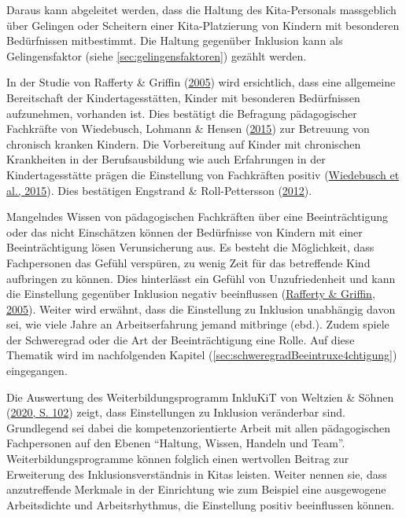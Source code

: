 \documentclass[
  ngerman,
  11pt,
  paper=a4,
  twoside,
  titlepage=true,
  openright,
  abstract=on,
  toc=listofnumbered,
  numbers=noenddot,
  chapterprefix=true,
  headings=optiontohead,
  svgnames,
  dvipsnames]{scrreprt}
\begin{document}
Daraus kann abgeleitet werden, dass die Haltung des Kita-Personals
massgeblich über Gelingen oder Scheitern einer Kita-Platzierung von
Kindern mit besonderen Bedürfnissen mitbestimmt. Die Haltung gegenüber
Inklusion kann als Gelingensfaktor (siehe \cref{sec:gelingensfaktoren})
gezählt werden.

In der Studie von Rafferty \& Griffin
(\protect\hyperlink{ref-raffertyux5cux26Griffin2005}{2005}) wird
ersichtlich, dass eine allgemeine Bereitschaft der Kindertagesstätten,
Kinder mit besonderen Bedürfnissen aufzunehmen, vorhanden ist. Dies
bestätigt die Befragung pädagogischer Fachkräfte von Wiedebusch, Lohmann
\& Hensen (\protect\hyperlink{ref-wiedebusch2015}{2015}) zur Betreuung
von chronisch kranken Kindern. Die Vorbereitung auf Kinder mit
chronischen Krankheiten in der Berufsausbildung wie auch Erfahrungen in
der Kindertagesstätte prägen die Einstellung von Fachkräften positiv
(\protect\hyperlink{ref-wiedebusch2015}{Wiedebusch et al., 2015}). Dies
bestätigen Engstrand \& Roll-Pettersson
(\protect\hyperlink{ref-zakirova}{2012}).

Mangelndes Wissen von pädagogischen Fachkräften über eine
Beeinträchtigung oder das nicht Einschätzen können der Bedürfnisse von
Kindern mit einer Beeinträchtigung lösen Verunsicherung aus. Es besteht
die Möglichkeit, dass Fachpersonen das Gefühl verspüren, zu wenig Zeit
für das betreffende Kind aufbringen zu können. Dies hinterlässt ein
Gefühl von Unzufriedenheit und kann die Einstellung gegenüber Inklusion
negativ beeinflussen
(\protect\hyperlink{ref-raffertyux5cux26Griffin2005}{Rafferty \&
Griffin, 2005}). Weiter wird erwähnt, dass die Einstellung zu Inklusion
unabhängig davon sei, wie viele Jahre an Arbeitserfahrung jemand
mitbringe (ebd.). Zudem spiele der Schweregrad oder die Art der
Beeinträchtigung eine Rolle. Auf diese Thematik wird im nachfolgenden
Kapitel (\cref{sec:schweregradBeeintruxe4chtigung}) eingegangen.

Die Auswertung des Weiterbildungsprogramm InkluKiT von Weltzien \&
Söhnen
(\protect\hyperlink{ref-einstellungPuxe4dagogischerFachkruxe4ften_Weltzien}{2020,
S. 102}) zeigt, dass Einstellungen zu Inklusion veränderbar sind.
Grundlegend sei dabei die kompetenzorientierte Arbeit mit allen
pädagogischen Fachpersonen auf den Ebenen “Haltung, Wissen, Handeln und
Team”. Weiterbildungsprogramme können folglich einen wertvollen Beitrag
zur Erweiterung des Inklusionsverständnis in Kitas leisten. Weiter
nennen sie, dass anzutreffende Merkmale in der Einrichtung wie zum
Beispiel eine ausgewogene Arbeitsdichte und Arbeitsrhythmus, die
Einstellung positiv beeinflussen können.
\end{document}

